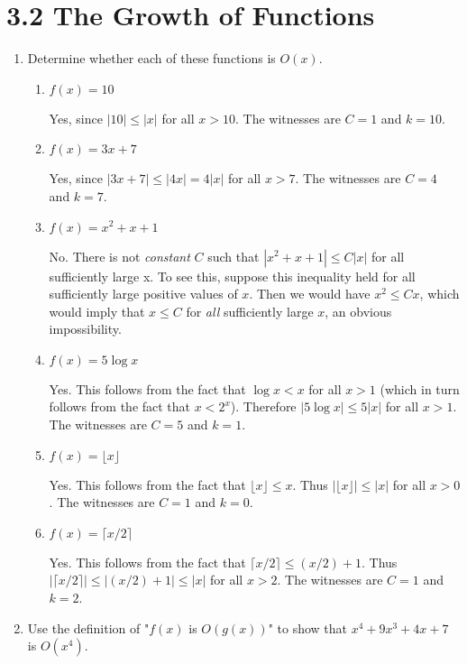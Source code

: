 \documentclass[11pt]{article}
\begin{document}
\section*{\textbf{3.2 The Growth of Functions}}
\begin{enumerate}[label=\textbf{\arabic*.}]
	\item Determine whether each of these functions is $O(x)$.
	
	\begin{enumerate}[label=\textbf{\alph*)}]
		\item $f(x) = 10$
		
		Yes, since $|10| \leq |x|$ for all $x > 10$. The witnesses are $C = 1$ and $k = 10$.
		
		\item $f(x) = 3x + 7$
		
		Yes, since $|3x + 7| \leq |4x| = 4|x|$ for all $x > 7$. The witnesses are $C = 4$ and $k = 7$.
		
		\item $f(x) = x^2 + x + 1$
		
		No. There is not \emph{constant} $C$ such that $|x^2 + x + 1| \leq C|x|$ for all sufficiently large x. To see this, suppose this inequality held for all sufficiently large positive values of $x$. Then we would have $x^2 \leq Cx$, which would imply that $x \leq C$ for \emph{all} sufficiently large $x$, an obvious impossibility.
		
		\item $f(x) = 5 \log x$
		
		Yes. This follows from the fact that $\log x < x$ for all $x > 1$ (which in turn follows from the fact that $x < 2^x$). Therefore $|5 \log x| \leq 5|x|$ for all $x > 1$. The witnesses are $C = 5$ and $k = 1$.
		
		\item $f(x) = \lfloor x \rfloor$
		
		Yes. This follows from the fact that $\lfloor x \rfloor \leq x$. Thus $|\lfloor x \rfloor| \leq |x|$ for all $x > 0$. The witnesses are $C = 1$ and $k = 0$.
		
		\item $f(x) = \lceil x / 2 \rceil$
		
		Yes. This follows from the fact that $\lceil x / 2 \rceil \leq (x / 2) + 1$. Thus $|\lceil x / 2 \rceil| \leq |(x / 2) + 1| \leq |x|$ for all $x > 2$. The witnesses are $C = 1$ and $k = 2$.
	\end{enumerate}

	\item Use the definition of "$f(x)$ is $O(g(x))$" to show that $x^4 + 9x^3 + 4x + 7$ is $O(x^4)$.
	

\end{enumerate}
\end{document}

